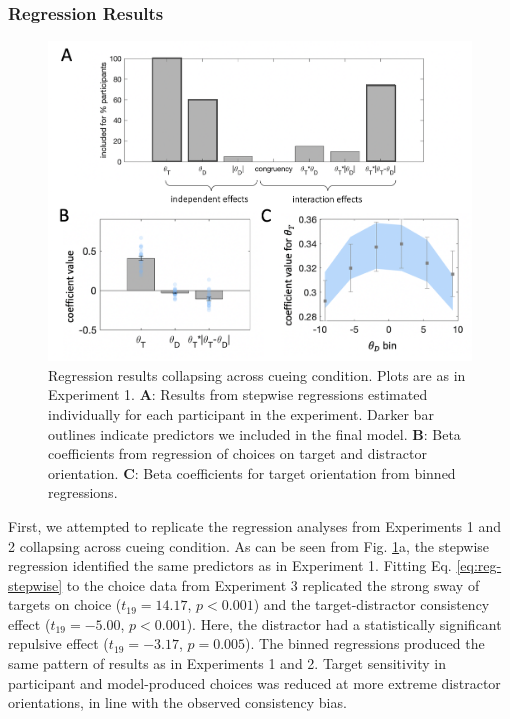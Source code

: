 \documentclass[a4paper, nobind]{templates/ociamthesis}
\begin{document}
\hypertarget{regression-results-2}{%
\subsubsection{Regression Results}\label{regression-results-2}}

\begin{figure}

{\centering \includegraphics[width=1\linewidth]{figures/distr-regr-c} 

}

\caption[Experiment 3, Regression results]{Regression results collapsing across cueing condition. Plots are as in Experiment 1. $\textbf{A:}$ Results from stepwise regressions estimated individually for each participant in the experiment. Darker bar outlines indicate predictors we included in the final model. $\textbf{B:}$ Beta coefficients from regression of choices on target and distractor orientation. $\textbf{C:}$ Beta coefficients for target orientation from binned regressions.}\label{fig:distr-regr-c}
\end{figure}

First, we attempted to replicate the regression analyses from Experiments 1 and 2 collapsing across cueing condition. As can be seen from Fig. \ref{fig:distr-regr-c}a, the stepwise regression identified the same predictors as in Experiment 1. Fitting Eq. \eqref{eq:reg-stepwise} to the choice data from Experiment 3 replicated the strong sway of targets on choice (\(t_{19}=14.17\), \(p<0.001\)) and the target-distractor consistency effect (\(t_{19}=-5.00\), \(p<0.001\)). Here, the distractor had a statistically significant repulsive effect (\(t_{19}=-3.17\), \(p=0.005\)). The binned regressions produced the same pattern of results as in Experiments 1 and 2. Target sensitivity in participant and model-produced choices was reduced at more extreme distractor orientations, in line with the observed consistency bias.
\end{document}
